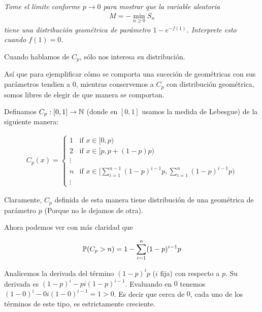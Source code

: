 \emph{
    Tome el límite conforme $p\to 0$ para mostrar que la variable aleatoria 
    \begin{align}
        M=-\min_{n\geq 0}S_n
    \end{align}
    tiene una distribuci\'on geom\'etrica de par\'ametro $1-e^{-f(1)}$. Interprete esto cuando $f(1)=0$.
}

Cuando hablamos de $C_p$, sólo nos interesa su distribución.\par\null

Así que para ejemplificar cómo se comporta una suceción de geométricas con sus parámetros tendien a $0$,
mientras conservemos a $C_p$ con distribución geométrica, somos libres de elegir de que manera se comportan.\par\null

Definamos $C_p : [0,1] \rightarrow \mathbb{N}$ (donde en $[0,1]$ usamos la medida de Lebesgue) de la siguiente manera:

\begin{align}
    C_{p}(x) = 
        \begin{cases}
            1       & \mbox{if } x \in [0, p)                                                                               \\
            2       & \mbox{if } x \in [p, p + (1-p)p)                                                                      \\
            \vdots  &                                                                                                       \\
            n       & \mbox{if } x \in \bigg[\sum_{i = 1}^{n - 1} (1 - p)^{i - 1}p , \sum_{i = 1}^n (1-p)^{i-1}p \bigg)     \\
            \vdots  &                                               
        \end{cases}
\end{align}

Claramente, $C_p$ definida de esta manera tiene distribución de una geométrica de parámetro $p$ (Porque no le dejamos de otra).\par\null

Ahora podemos ver con más claridad que 

\begin{align}
    \mathbb{P}(C_p > n) = 1 - \sum_{i = 1}^n (1-p)^{i-1}p
\end{align}

Analicemos la derivada del término $(1-p)^{i}p$ ($i$ fija) con respecto a $p$. Su derivada es $(1-p)^i - p i (1-p)^{i-1}$.
Evaluando en $0$ tenemos \\
$(1-0)^i - 0 i (1-0)^{i-1} = 1 > 0$. Es decir que cerca de $0$, cada uno de los términos de este tipo, es 
estrictamente creciente.\par\null

